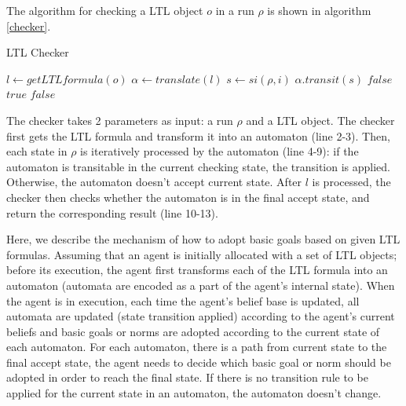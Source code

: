 \documentclass{article}
\begin{document}
The algorithm for checking a LTL object $o$ in a run $\rho$ is shown in algorithm \ref{checker}.
\begin{algorithm}
\caption{LTL Checker}\label{checker}
\begin{algorithmic}[1]
\State $l \gets getLTLformula(o)$
\State $\alpha \gets translate(l)$ 
\State $s \gets si(\rho, i)$
\State $\alpha.transit(s)$
\Else
\State \Return $false$
\EndIf
\EndFor
{}
\State \Return $true$
\Else
\State \Return $false$
\EndIf
\EndProcedure
\end{algorithmic}
\end{algorithm}
The checker takes 2 parameters as input: a run $\rho$ and a LTL object.
%
The checker first gets the LTL formula and transform it into an automaton (line 2-3). Then, each state in $\rho$ is iteratively processed by the automaton (line 4-9): if the automaton is transitable in the current checking state, the transition is applied. Otherwise, the automaton doesn't accept current state. After $l$ is processed, the checker then checks whether the automaton is in the final accept state, and return the corresponding result (line 10-13).

Here, we describe the mechanism of how to adopt basic goals based on given LTL formulas.
Assuming that an agent is initially allocated with a set of LTL objects; before its execution, the agent first transforms each of the LTL formula into an automaton (automata are encoded as a part of the agent's internal state). 
When the agent is in execution, each time the agent's belief base is updated, all automata are updated (state transition applied) according to the agent's current beliefs and basic goals or norms are adopted according to the current state of each automaton. For each automaton, there is a path from current state to the final accept state, the agent needs to decide which basic goal or norm should be adopted in order to reach the final state. If there is no transition rule to be applied for the current state in an automaton, the automaton doesn't change.
\end{document}
